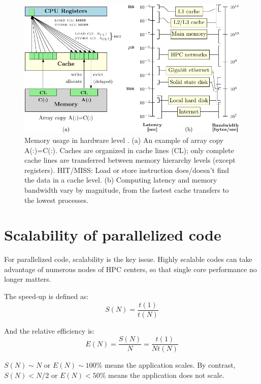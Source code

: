 \begin{figure}[h]
\begin{centering}
\includegraphics{_figure/memory}
\par\end{centering}

\caption [Memory usage in hardware level]{Memory usage in hardware level \citep{LRZ-cours}. (a) An example
of array copy A(:)=C(:). Caches are organized in cache lines (CL);
only complete cache lines are transferred between memory hierarchy
levels (except registers). HIT/MISS: Load or store instruction does/doesn't
find the data in a cache level. (b) Computing latency and memory bandwidth
vary by magnitude, from the fastest cache transfers to the lowest
processes.\label{fig:Memory}}
\end{figure}



\section{Scalability of parallelized code}

For parallelized code, scalability is the key issue. Highly scalable
codes can take advantage of numerous nodes of HPC centers, so that
single core performance no longer matters. 

The speed-up is defined as:
\begin{equation}
S(N)=\dfrac{t(1)}{t(N)}
\end{equation}


And the relative efficiency is:
\begin{equation}
E(N)=\dfrac{S(N)}{N}=\dfrac{t(1)}{Nt(N)}
\end{equation}


$S(N)\sim N$ or $E(N)\sim100\%$ means the application scales. 
By contrast, $S(N)<N/2$ or $E(N)<50\%$ means the application does
not scale. 


